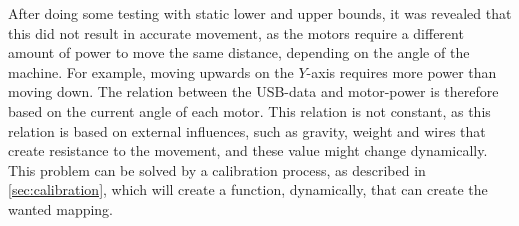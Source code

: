 After doing some testing with static lower and upper bounds, it was revealed that this did not result in accurate movement, as the motors require a different amount of power to move the same distance, depending on the angle of the machine.
For example, moving upwards on the $Y$-axis requires more power than moving down.
The relation between the USB-data and motor-power is therefore based on the current angle of each motor.
This relation is not constant, as this relation is based on external influences, such as gravity, weight and wires that create resistance to the movement, and these value might change dynamically.
This problem can be solved by a calibration process, as described in \autoref{sec:calibration}, which will create a function, dynamically, that can create the wanted mapping.